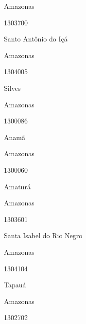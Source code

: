 \documentclass[
  letterpaper,
]{report}
\begin{document}
\n      

Amazonas

\n      

1303700

\n      

Santo Antônio do Içá

\n    

\n    

\n      

Amazonas

\n      

1304005

\n      

Silves

\n    

\n    

\n      

Amazonas

\n      

1300086

\n      

Anamã

\n    

\n    

\n      

Amazonas

\n      

1300060

\n      

Amaturá

\n    

\n    

\n      

Amazonas

\n      

1303601

\n      

Santa Isabel do Rio Negro

\n    

\n    

\n      

Amazonas

\n      

1304104

\n      

Tapauá

\n    

\n    

\n      

Amazonas

\n      

1302702

\n      
\end{document}
